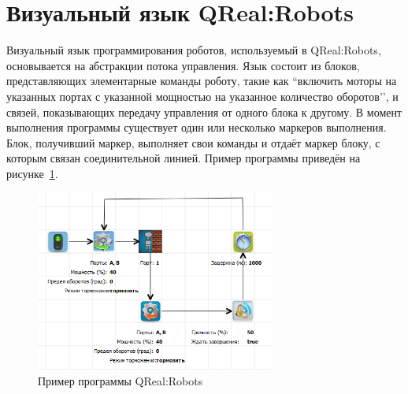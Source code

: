\documentclass[a4paper]{article}
\begin{document}
{\section{Визуальный язык QReal:Robots}
Визуальный язык программирования роботов, используемый в QReal:Robots, основывается на абстракции потока управления. Язык состоит из блоков, представляющих элементарные команды роботу, такие как ``включить моторы на указанных портах с указанной мощностью на указанное количество оборотов’’, и связей, показывающих передачу управления от одного блока к другому. В момент выполнения программы существует один или несколько маркеров выполнения. Блок, получивший маркер, выполняет свои команды и отдаёт маркер блоку, с которым связан соединительной линией. Пример программы приведён на рисунке~\ref{programExample}.

\begin{figure} [ht]
  \begin{center}
    \includegraphics[width=0.7\textwidth]{programExample.png}
    \caption{Пример программы QReal:Robots}
    \label{programExample}
  \end{center}
\end{figure}

}
\end{document}
